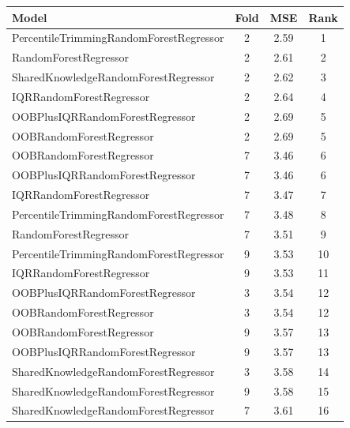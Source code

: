 \begin{table}[h]
\centering
\begin{tabular}{|l|c|c|c|}
\hline
Model & Fold & MSE & Rank \\ \hline
\textcolor[HTML]{f46a9b}{PercentileTrimmingRandomForestRegressor} & 2 & 2.59 & 1 \\ \hline
\textcolor[HTML]{87bc45}{RandomForestRegressor} & 2 & 2.61 & 2 \\ \hline
\textcolor[HTML]{ef9b20}{SharedKnowledgeRandomForestRegressor} & 2 & 2.62 & 3 \\ \hline
\textcolor[HTML]{27aeef}{IQRRandomForestRegressor} & 2 & 2.64 & 4 \\ \hline
\textcolor[HTML]{ede15b}{OOBPlusIQRRandomForestRegressor} & 2 & 2.69 & 5 \\ \hline
\textcolor[HTML]{b33dc6}{OOBRandomForestRegressor} & 2 & 2.69 & 5 \\ \hline
\textcolor[HTML]{b33dc6}{OOBRandomForestRegressor} & 7 & 3.46 & 6 \\ \hline
\textcolor[HTML]{ede15b}{OOBPlusIQRRandomForestRegressor} & 7 & 3.46 & 6 \\ \hline
\textcolor[HTML]{27aeef}{IQRRandomForestRegressor} & 7 & 3.47 & 7 \\ \hline
\textcolor[HTML]{f46a9b}{PercentileTrimmingRandomForestRegressor} & 7 & 3.48 & 8 \\ \hline
\textcolor[HTML]{87bc45}{RandomForestRegressor} & 7 & 3.51 & 9 \\ \hline
\textcolor[HTML]{f46a9b}{PercentileTrimmingRandomForestRegressor} & 9 & 3.53 & 10 \\ \hline
\textcolor[HTML]{27aeef}{IQRRandomForestRegressor} & 9 & 3.53 & 11 \\ \hline
\textcolor[HTML]{ede15b}{OOBPlusIQRRandomForestRegressor} & 3 & 3.54 & 12 \\ \hline
\textcolor[HTML]{b33dc6}{OOBRandomForestRegressor} & 3 & 3.54 & 12 \\ \hline
\textcolor[HTML]{b33dc6}{OOBRandomForestRegressor} & 9 & 3.57 & 13 \\ \hline
\textcolor[HTML]{ede15b}{OOBPlusIQRRandomForestRegressor} & 9 & 3.57 & 13 \\ \hline
\textcolor[HTML]{ef9b20}{SharedKnowledgeRandomForestRegressor} & 3 & 3.58 & 14 \\ \hline
\textcolor[HTML]{ef9b20}{SharedKnowledgeRandomForestRegressor} & 9 & 3.58 & 15 \\ \hline
\textcolor[HTML]{ef9b20}{SharedKnowledgeRandomForestRegressor} & 7 & 3.61 & 16 \\ \hline

\end{tabular}
\end{table}
